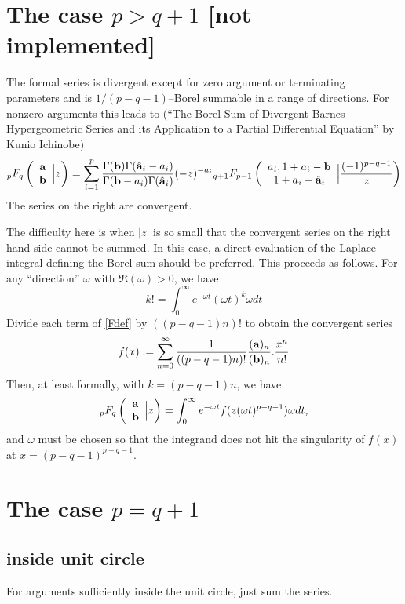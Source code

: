 \documentclass[10pt]{article}
\numberwithin{equation}{section}
\newcommand{\F}[5] {{}_{#1}F_{#2} \left( \begin{array}{c} #3 \\ #4 \end{array} \Big| #5  \right)}
\begin{document}
\section{The case $p > q+1$ [not implemented]}
The formal series is divergent except for zero argument or terminating parameters and is $1/(p-q-1)$--Borel summable in a range of directions. For nonzero arguments this leads to (``The Borel Sum of Divergent Barnes Hypergeometric Series and its Application to a Partial Differential Equation'' by Kunio Ichinobe)
\begin{equation*}
\F{p}{q}{\bold{a}}{\bold{b}}{z} = \sum_{i=1}^{p} \frac{\Gamma(\bold{b}) \Gamma(\hat{\bold{a}}_i-a_i)}{\Gamma(\bold{b}-a_i) \Gamma(\hat{\bold{a}}_i)} (-z)^{-a_i} \F{q+1}{p-1}{a_i,1+a_i-\bold{b}}{1+a_i-\hat{\bold{a}}_i}{\frac{(-1)^{p-q-1}}{z}}
\end{equation*}
The series on the right are convergent.

The difficulty here is when $|z|$ is so small that the convergent series on the right hand side cannot be summed. In this case, a direct evaluation of the Laplace integral defining the Borel sum should be preferred. This proceeds
as follows. For any ``direction'' $\omega$ with $\Re(\omega) > 0$, we have
\begin{equation*}
k! = \int_0^{\infty} e^{-\omega t} (\omega t)^k \omega dt
\end{equation*}
Divide each term of \eqref{Fdef} by $((p-q-1)n)!$ to obtain the convergent series
\begin{equation*}
f(x) := \sum_{n=0}^{\infty} \frac{1}{((p-q-1)n)!}\frac{(\bold{a})_n}{(\bold{b})_n}\text{.} \frac{x^n}{n!}
\end{equation*}
Then, at least formally, with $k = (p-q-1)n$, we have
\begin{equation*}
\F{p}{q}{\bold{a}}{\bold{b}}{z} = \int_{0}^{\infty} e^{-\omega t} f(z(\omega t)^{p-q-1}) \omega dt \text{,}
\end{equation*}
and $\omega$ must be chosen so that the integrand does not hit the singularity of $f(x)$ at $x = (p-q-1)^{p-q-1}$.


\section{The case $p=q+1$}

\subsection{inside unit circle}
For arguments sufficiently inside the unit circle, just sum the series.
\end{document}
